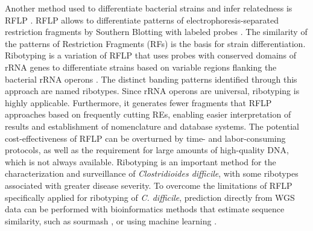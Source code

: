 Another method used to differentiate bacterial strains and infer relatedness is \ac{RFLP} \cite{thibodeau_use_1987, todd_chromosome_2001}. \ac{RFLP} allows to differentiate patterns of electrophoresis-separated restriction fragments by Southern Blotting with labeled probes \cite{southern_detection_1975}. The similarity of the patterns of Restriction Fragments (\acs{RF}s) is the basis for strain differentiation. Ribotyping is a variation of \ac{RFLP} that uses probes with conserved domains of \ac{rRNA} genes to differentiate strains based on variable regions flanking the bacterial \ac{rRNA} operons \cite{bingen_use_1994}. The distinct banding patterns identified through this approach are named ribotypes. Since \ac{rRNA} operons are universal, ribotyping is highly applicable. Furthermore, it generates fewer fragments that \ac{RFLP} approaches based on frequently cutting \acs{RE}s, enabling easier interpretation of results and establishment of nomenclature and database systems. The potential cost-effectiveness of \ac{RFLP} can be overturned by time- and labor-consuming protocols, as well as the requirement for large amounts of high-quality \ac{DNA}, which is not always available. Ribotyping is an important method for the characterization and surveillance of \textit{Clostridioides difficile}, with some ribotypes associated with greater disease severity. To overcome the limitations of \ac{RFLP} specifically applied for ribotyping of \textit{C. difficile}, prediction directly from \ac{WGS} data can be performed with bioinformatics methods that estimate sequence similarity, such as sourmash \cite{moore_k-mer_2022, irber_sourmash_2024}, or using machine learning \cite{qi_p-224_2025}.

